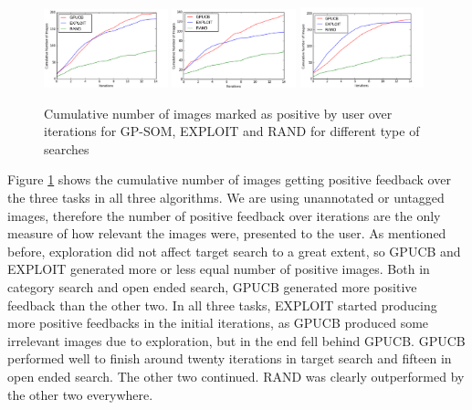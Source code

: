 \documentclass[english]{tktltiki}
\begin{document}
\begin{figure}[h!]
  \centering
    \includegraphics[width=0.32\textwidth]{figures/Target_Positive.png}
    \includegraphics[width=0.32\textwidth]{figures/Category_Positive.png}
    \includegraphics[width=0.32\textwidth]{figures/Open_Positive.png}
    \caption{Cumulative number of images marked as positive by user over iterations for GP-SOM, EXPLOIT and RAND for different type of searches}
    \label{positive_feedback}
\end{figure}

Figure \ref{positive_feedback} shows the cumulative number of images getting positive feedback over the three tasks in all three algorithms. We are using unannotated or untagged images, therefore the number of positive feedback over iterations are the only measure of how relevant the images were, presented to the user. As mentioned before, exploration did not affect target search to a great extent, so GPUCB and EXPLOIT generated more or less equal number of positive images. Both in category search and open ended search, GPUCB generated more positive feedback than the other two. In all three tasks, EXPLOIT started producing more positive feedbacks in the initial iterations, as GPUCB produced some irrelevant images due to exploration, but in the end fell behind GPUCB. GPUCB performed well to finish around twenty iterations in target search and fifteen in open ended search. The other two continued. RAND was clearly outperformed by the other two everywhere.
\end{document}
